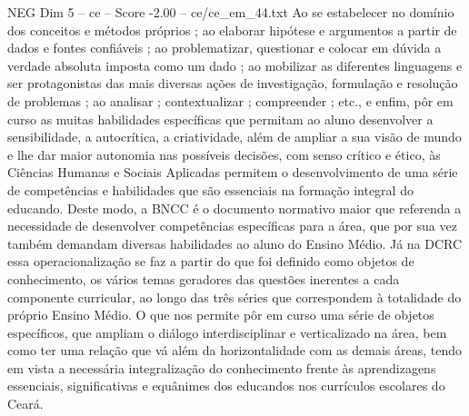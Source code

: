 \begin{textsample}{NEG Dim 5 – ce – Score -2.00 – ce/ce\_em\_44.txt}
Ao se estabelecer no domínio dos conceitos e métodos próprios ; ao elaborar hipótese e argumentos a partir de dados e fontes confiáveis ; ao problematizar, questionar e colocar em dúvida a verdade absoluta imposta como um dado ; ao mobilizar as diferentes linguagens e ser protagonistas das mais diversas ações de investigação, formulação e resolução de problemas ; ao analisar ; contextualizar ; compreender ; etc., e enfim, pôr em curso as muitas habilidades específicas que permitam ao aluno desenvolver a sensibilidade, a autocrítica, a criatividade, além de ampliar a sua visão de mundo e lhe dar maior autonomia nas possíveis decisões, com senso crítico e ético, às Ciências Humanas e Sociais Aplicadas permitem o desenvolvimento de uma série de competências e habilidades que são essenciais na formação integral do educando.
Deste modo, a BNCC é o documento normativo maior que referenda a necessidade de desenvolver competências específicas para a área, que por sua vez também demandam diversas habilidades ao aluno do Ensino Médio.
Já na DCRC essa operacionalização se faz a partir do que foi definido como objetos de conhecimento, os vários temas geradores das questões inerentes a cada componente curricular, ao longo das três séries que correspondem à totalidade do próprio Ensino Médio.
O que nos permite pôr em curso uma série de objetos específicos, que ampliam o diálogo interdisciplinar e verticalizado na área, bem como ter uma relação que vá além da horizontalidade com as demais áreas, tendo em vista a necessária integralização do conhecimento frente às aprendizagens essenciais, significativas e equânimes dos educandos nos currículos escolares do Ceará.

\end{textsample}
